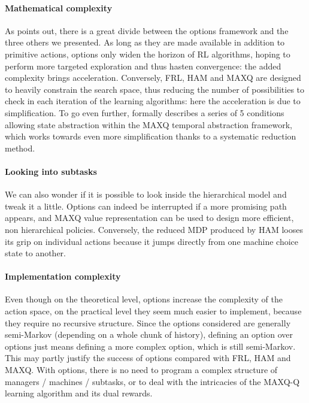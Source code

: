 \documentclass{article}
\begin{document}
\paragraph{Mathematical complexity} As \cite{jong_utility_2008} points out, there is a great divide between the options framework and the three others we presented. As long as they are made available in addition to primitive actions, options only widen the horizon of RL algorithms, hoping to perform more targeted exploration and thus hasten convergence: the added complexity brings acceleration. Conversely, FRL, HAM and MAXQ are designed to heavily constrain the search space, thus reducing the number of possibilities to check in each iteration of the learning algorithms: here the acceleration is due to simplification. To go even further, \cite{dietterich_hierarchical_2000} formally describes a series of 5 conditions allowing state abstraction within the MAXQ temporal abstraction framework, which works towards even more simplification thanks to a systematic reduction method.

\paragraph{Looking into subtasks} We can also wonder if it is possible to look inside the hierarchical model and tweak it a little. Options can indeed be interrupted if a more promising path appears, and MAXQ value representation can be used to design more efficient, non hierarchical policies. Conversely, the reduced MDP produced by HAM looses its grip on individual actions because it jumps directly from one machine choice state to another.

\paragraph{Implementation complexity} Even though on the theoretical level, options increase the complexity of the action space, on the practical level they seem much easier to implement, because they require no recursive structure. Since the options considered are generally semi-Markov (depending on a whole chunk of history), defining an option over options just means defining a more complex option, which is still semi-Markov. This may partly justify the success of options compared with FRL, HAM and MAXQ. With options, there is no need to program a complex structure of managers / machines / subtasks, or to deal with the intricacies of the MAXQ-Q learning algorithm and its dual rewards.
\end{document}
